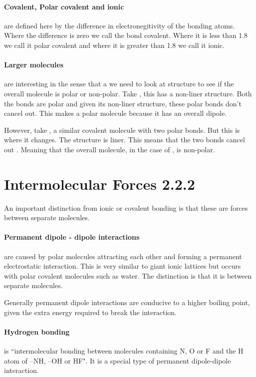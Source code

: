 \documentclass[11pt,a4paper]{memoir}
\begin{document}
	\paragraph{Covalent, Polar covalent and ionic} are defined here by the difference in electronegitivity of the bonding atoms. Where the difference is zero we call the bond covalent. Where it is less than 1.8 we call it polar covalent and where it is greater than 1.8 we call it ionic.
	
	\paragraph{Larger molecules} are interesting in the sense that a we need to look at structure to see if the overall molecule is polar or non-polar. Take , this has a non-liner structure. Both the  bonds are polar and given its non-liner structure, these polar bonds don't cancel out. This makes  a polar molecule because it has an overall dipole.
	
	However, take , a similar covalent molecule with two  polar bonds. But this is where it changes. The structure is liner. This means that the two bonds cancel out . Meaning that the overall molecule, in the case of , is non-polar.
	
\section{Intermolecular Forces 2.2.2}
An important distinction from ionic or covalent bonding is that these are forces between separate molecules.

	\paragraph{Permanent dipole - dipole interactions} are caused by polar molecules attracting each other and forming a permanent electrostatic interaction. This is very similar to giant ionic lattices but occurs with polar covalent molecules such as water. The distinction is that it is between separate molecules.
	
	Generally permanent dipole interactions are conducive to a higher boiling point, given the extra energy required to break the interaction.
	
	\paragraph{Hydrogen bonding} is ``intermolecular bonding between molecules containing N, O or F and the H atom of –NH, –OH or HF". It is a special type of permanent dipole-dipole interaction. 
	
\end{document}
